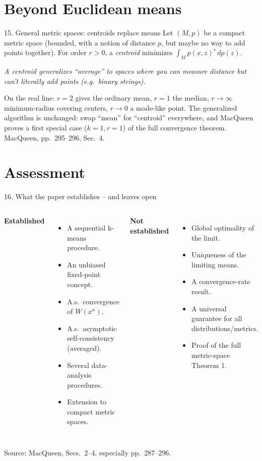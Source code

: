 \documentclass[10pt,compress]{beamer}
\newcommand{\defline}[1]{{\footnotesize\textcolor{aggiemaroon}{\textit{#1}}\par}}
\begin{document}
\section[Metric spaces]{Beyond Euclidean means}

\begin{frame}{15. General metric spaces: centroids replace means}
Let $(M,p)$ be a compact metric space (bounded, with a notion of distance $p$, but maybe no way to add points together). For order $r>0$, a \emph{centroid} minimizes $\int_M p(x,z)^r\,dp(z)$.
\defline{A centroid generalizes ``average'' to spaces where you can measure distance but can't literally add points (e.g.\ binary strings).}
On the real line: $r=2$ gives the ordinary mean, $r=1$ the median, $r\to\infty$ minimum-radius covering centers, $r\to0$ a mode-like point. The generalized algorithm is unchanged: swap ``mean'' for ``centroid'' everywhere, and MacQueen proves a first special case ($k=1,r=1$) of the full convergence theorem.
\vfill
{\scriptsize MacQueen, pp.~295--296, Sec.~4.}
\end{frame}

\section{Assessment}

\begin{frame}{16. What the paper establishes -- and leaves open}
\footnotesize
\begin{columns}[T]
\textbf{Established}
\begin{itemize}
\item A sequential k-means procedure.
\item An unbiased fixed-point concept.
\item A.s.\ convergence of $W(x^n)$.
\item A.s.\ asymptotic self-consistency (averaged).
\item Several data-analysis procedures.
\item Extension to compact metric spaces.
\end{itemize}
\textbf{Not established}
\begin{itemize}
\item Global optimality of the limit.
\item Uniqueness of the limiting means.
\item A convergence-rate result.
\item A universal guarantee for all distributions/metrics.
\item Proof of the full metric-space Theorem 1.
\end{itemize}
\end{columns}
\vfill
{\scriptsize Source: MacQueen, Secs.~2--4, especially pp.~287--296.}
\end{frame}
\end{document}
